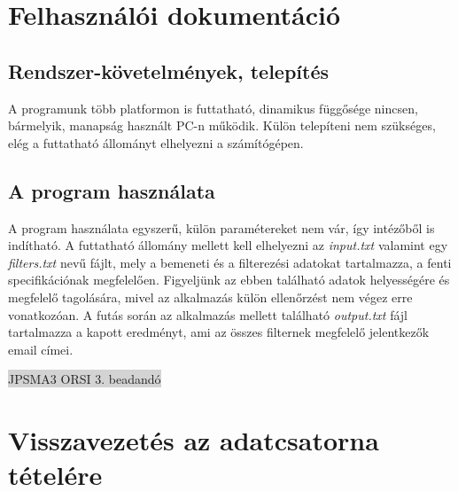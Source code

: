 \documentclass[12pt]{article}
\begin{document}

\section{Felhasználói dokumentáció}

\subsection{Rendszer-követelmények, telepítés}

A programunk több platformon is futtatható, dinamikus függősége nincsen, bármelyik, manapság
használt PC-n működik. Külön telepíteni nem szükséges, elég a futtatható állományt elhelyezni
a számítógépen.

\subsection{A program használata}

A program használata egyszerű, külön paramétereket nem vár, így intézőből is indítható. A
futtatható állomány mellett kell elhelyezni az \textit{input.txt} valamint egy 
\textit{filters.txt} nevű fájlt, mely a bemeneti és a filterezési
adatokat tartalmazza, a fenti specifikációnak megfelelően. Figyeljünk az ebben található
adatok helyességére és megfelelő tagolására, mivel az alkalmazás külön ellenőrzést nem végez
erre vonatkozóan. A futás során az alkalmazás mellett található \textit{output.txt} fájl
tartalmazza a kapott eredményt, ami az összes filternek megfelelő jelentkezők email címei.

\newpage
\thispagestyle{empty}
\begin{center}
	\colorbox{lightgray}{{\large JPSMA3} \hspace{4.3cm} {\large ORSI 3. beadandó} \hspace{5.7cm} \thepage}
\end{center}

\section{Visszavezetés az adatcsatorna tételére}
\end{document}
